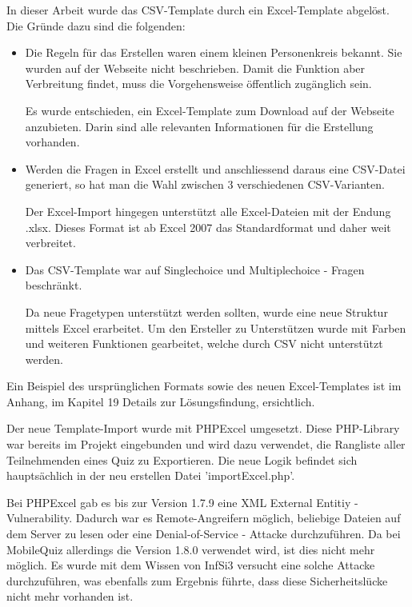 In dieser Arbeit wurde das CSV-Template durch ein Excel-Template abgelöst. Die Gründe dazu sind die folgenden:
\begin{itemize}
	\item Die Regeln für das Erstellen waren einem kleinen Personenkreis bekannt. Sie wurden auf der Webseite nicht beschrieben. Damit die Funktion aber Verbreitung findet, muss die Vorgehensweise öffentlich zugänglich sein.
	
	Es wurde entschieden, ein Excel-Template zum Download auf der Webseite anzubieten. Darin sind alle relevanten Informationen für die Erstellung vorhanden.
	
	\item Werden die Fragen in Excel erstellt und anschliessend daraus eine CSV-Datei generiert, so hat man die Wahl zwischen 3 verschiedenen CSV-Varianten.
	
	Der Excel-Import hingegen unterstützt alle Excel-Dateien mit der Endung .xlsx. Dieses Format ist ab Excel 2007 das Standardformat und daher weit verbreitet.
	\cite{microsoft2016}
	
	\item Das CSV-Template war auf Singlechoice und Multiplechoice - Fragen beschränkt.
	
	Da neue Fragetypen unterstützt werden sollten, wurde eine neue Struktur mittels Excel erarbeitet. Um den Ersteller zu Unterstützen wurde mit Farben und weiteren Funktionen gearbeitet, welche durch CSV nicht unterstützt werden.
\end{itemize}

Ein Beispiel des ursprünglichen Formats sowie des neuen Excel-Templates ist im Anhang, im Kapitel 19 Details zur Lösungsfindung, ersichtlich.

Der neue Template-Import wurde mit PHPExcel \cite{phpexcel} umgesetzt. Diese PHP-Library war bereits im Projekt eingebunden und wird dazu verwendet, die Rangliste aller Teilnehmenden eines Quiz zu Exportieren. Die neue Logik befindet sich hauptsächlich in der neu erstellen Datei 'importExcel.php'.

Bei PHPExcel gab es bis zur Version 1.7.9 eine \gls{XML External Entitiy} - \gls{Vulnerability}. Dadurch war es Remote-Angreifern möglich, beliebige Dateien auf dem Server zu lesen oder eine Denial-of-Service - Attacke durchzuführen. \cite{cvedetails_phpexcel} %
Da bei MobileQuiz allerdings die Version 1.8.0 verwendet wird, ist dies nicht mehr möglich. Es wurde mit dem Wissen von InfSi3 versucht eine solche Attacke durchzuführen, was ebenfalls zum Ergebnis führte, dass diese Sicherheitslücke nicht mehr vorhanden ist. %

